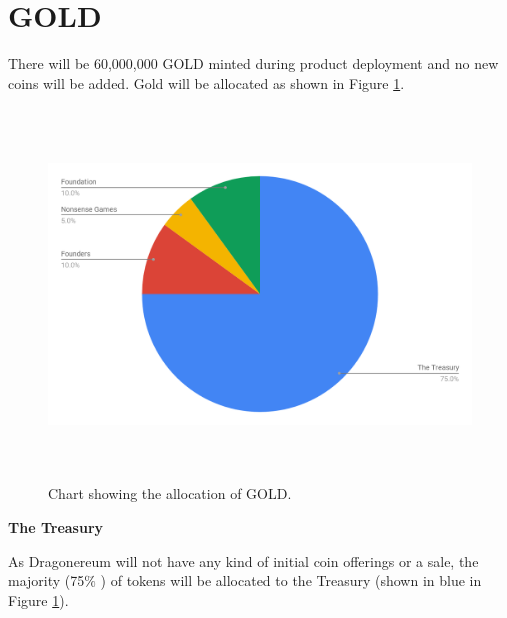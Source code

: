 \documentclass[12pt]{article}
\begin{document}

\newpage

\vspace{\baselineskip}\section{GOLD}
\label{GOLD} \par

There will be 60,000,000 GOLD minted during product deployment and no new coins will be added. Gold will be allocated as shown in Figure \ref{fig:Chart_showing_the_allocation_of_GOLD}.\par




\begin{figure}[H]
	\begin{FlushLeft}		\includegraphics[width=6.27in,height=3.88in]{./media/image26.png}
		\caption{Chart showing the allocation of GOLD.}
		\label{fig:Chart_showing_the_allocation_of_GOLD}
	\end{FlushLeft}\end{figure}




\textbf{The Treasury}\par

As Dragonereum will not have any kind of initial coin offerings or a sale, the majority (75$\%$ ) of tokens will be allocated to the Treasury (shown in blue in Figure \ref{fig:Chart_showing_the_allocation_of_GOLD}).\par
\end{document}
